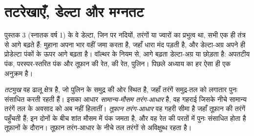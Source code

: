\begin{omfigure}
\par{}\label{fig:b3:facies-models:rivers}
\end{omfigure}

\section{तटरेखाएँ, डेल्टा और मग्नतट}\label{sec:b3:facies-models:shelves}

पुस्तक 3 (स्नातक वर्ष 1) के वे डेल्टा, जिन पर नदियों, तरंगों या ज्वारों का प्रभुत्व था, सभी
एक ही तंत्र से आगे बढ़ते हैं: मुहाना अपना भार वहीं जमा करता है, जहाँ धारा
मंद पड़ती है, और डेल्टा-अग्र अपने ही प्रोडेल्टा पंकों के ऊपर आगे बढ़ता है।
वॉल्थर के नियम से, आगे बढ़ता डेल्टा-अग्र या 
 छोड़ता है: अपतटीय पंक, परस्पर-स्तरित पंक और तूफ़ान की रेत,
 की रेत, पुलिन। पिछले अध्याय का हर  ऐसा ही एक
अनुक्रम है।

\begin{definition}[तटमुख और तरंग-आधार]\label{def:b3:facies-models:shoreface}
\emph{तटमुख} वह ढालू क्षेत्र है, जो पुलिन के समुद्र की ओर स्थित है,
जहाँ तरंगें समुद्र-तल को लगातार पुनः संसाधित करती रहती हैं। इसका आधार
\emph{सामान्य-मौसम तरंग-आधार} है, वह गहराई जिसके नीचे
सामान्य तरंगें तल के अवसाद को अब नहीं हिलातीं। \emph{तूफ़ान
तरंग-आधार} वह गहरी सीमा है जहाँ तूफ़ान की तरंगें पहुँचती हैं;
इन दोनों के बीच शांत मौसम में पंक जमता है, और वह रेत की परतों में पुनः संसाधित
होता है तूफ़ानों के दौरान। तूफ़ान तरंग-आधार के नीचे तल तरंगों से अविक्षुब्ध रहता है।
\end{definition}

